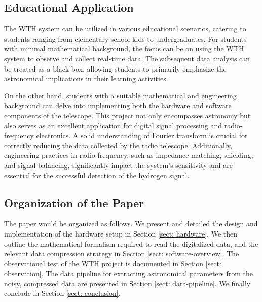 \documentclass[12pt]{article}
\begin{document}
    \subsection{Educational Application}
    The WTH system can be utilized in various educational scenarios, catering to students ranging from elementary school kids to undergraduates. 
    For students with minimal mathematical background, the focus can be on using the WTH system to observe and collect real-time data. 
    The subsequent data analysis can be treated as a black box, allowing students to primarily emphasize the astronomical implications in their learning activities.

    On the other hand, students with a suitable mathematical and engineering background can delve into implementing both the hardware and software components of the telescope. 
    This project not only encompasses astronomy but also serves as an excellent application for digital signal processing and radio-frequency electronics. A solid understanding of Fourier transform is crucial for correctly reducing the data collected by the radio telescope. 
    Additionally, engineering practices in radio-frequency, such as impedance-matching, shielding, and signal balancing, significantly impact the system's sensitivity and are essential for the successful detection of the hydrogen signal.
    
    \subsection{Organization of the Paper}
    The paper would be organized as follows.
    We present and detailed the design and implementation of the hardware setup in Section \ref{sect: hardware}. 
    We then outline the mathematical formalism required to read the digitalized data, and the relevant data compression strategy in Section \ref{sect: software-overview}. 
    The observational test of the WTH project is documented in Section \ref{sect: observation}. 
    The data pipeline for extracting astronomical parameters from the noisy, compressed data are presented in Section \ref{sect: data-pipeline}.
    We finally conclude in Section \ref{sect: conclusion}.
    
\end{document}
